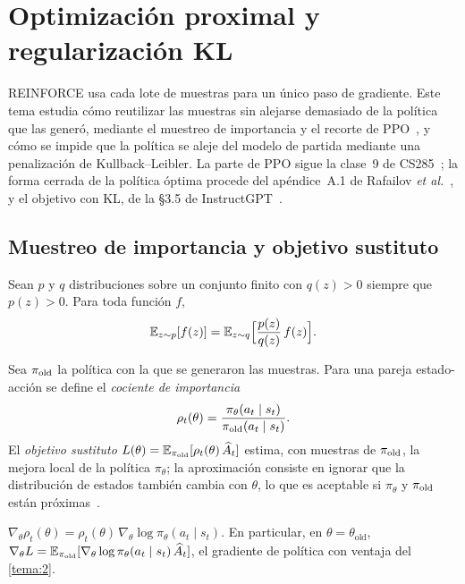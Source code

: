 \chapter{Optimización proximal y regularización KL}
\label{tema:3}

REINFORCE usa cada lote de muestras para un único paso de gradiente. Este tema estudia cómo reutilizar las muestras sin alejarse demasiado de la política que las generó, mediante el muestreo de importancia y el recorte de PPO~\cite{ppo}, y cómo se impide que la política se aleje del modelo de partida mediante una penalización de Kullback--Leibler. La parte de PPO sigue la clase~9 de CS285~\cite{cs285}; la forma cerrada de la política óptima procede del apéndice~A.1 de Rafailov \emph{et al.}~\cite{dpo}, y el objetivo con KL, de la §3.5 de InstructGPT~\cite{instructgpt}.

\section{Muestreo de importancia y objetivo sustituto}

\begin{proposicion}\label{prop:is}
Sean $p$ y $q$ distribuciones sobre un conjunto finito con $q(z)>0$ siempre que $p(z)>0$. Para toda función $f$,
\[
\mathbb{E}_{z\sim p}[f(z)]=\mathbb{E}_{z\sim q}\Bigl[\frac{p(z)}{q(z)}\,f(z)\Bigr].
\]
\end{proposicion}

Sea $\pi_{\mathrm{old}}$ la política con la que se generaron las muestras. Para una pareja estado-acción se define el \emph{cociente de importancia}
\[
\rho_t(\theta)=\frac{\pi_\theta(a_t\mid s_t)}{\pi_{\mathrm{old}}(a_t\mid s_t)}.
\]
El \emph{objetivo sustituto} $L(\theta)=\mathbb{E}_{\pi_{\mathrm{old}}}[\rho_t(\theta)\,\widehat A_t]$ estima, con muestras de $\pi_{\mathrm{old}}$, la mejora local de la política $\pi_\theta$; la aproximación consiste en ignorar que la distribución de estados también cambia con $\theta$, lo que es aceptable si $\pi_\theta$ y $\pi_{\mathrm{old}}$ están próximas~\cite{cs285}.

\begin{proposicion}\label{prop:sustituto}
$\nabla_\theta\rho_t(\theta)=\rho_t(\theta)\,\nabla_\theta\log\pi_\theta(a_t\mid s_t)$. En particular, en $\theta=\theta_{\mathrm{old}}$, $\nabla_\theta L=\mathbb{E}_{\pi_{\mathrm{old}}}[\nabla_\theta\log\pi_\theta(a_t\mid s_t)\,\widehat A_t]$, el gradiente de política con ventaja del \cref{tema:2}.
\end{proposicion}

